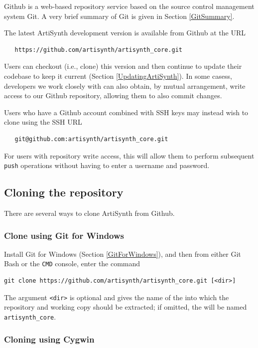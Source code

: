 Github is a web-based repository service based on the source control
management system Git. A very brief summary of Git is given in
Section \ref{GitSummary}.

The latest ArtiSynth development version is available from Github at the URL
\begin{verbatim}
   https://github.com/artisynth/artisynth_core.git
\end{verbatim}
Users can checkout (i.e., clone) this version and then continue to
update their codebase to keep it current
(Section \ref{UpdatingArtiSynth}). 
In some casess, developers we work closely with can also obtain, by
mutual arrangement, write access to our Github repository, allowing
them to also commit changes.

\begin{sideblock}
Users who have a Github account combined with SSH keys may instead
wish to clone using the SSH URL
\begin{verbatim}
   git@github.com:artisynth/artisynth_core.git
\end{verbatim}
For users with repository write access, this will allow them to
perform subsequent {\tt push} operations without having to
enter a username and password.
\end{sideblock}

\subsection{Cloning the repository}

There are several ways to clone ArtiSynth from Github.

\ifWindows

\subsubsection{Clone using Git for Windows}
\label{CloningUsingGitForWindows}

Install Git for Windows (Section \ref{GitForWindows}), and then from
either Git Bash or the {\tt CMD} console, enter the command
%
\begin{lstlisting}[]
  git clone https://github.com/artisynth/artisynth_core.git [<dir>]
\end{lstlisting}
%
The argument {\tt <dir>} is optional and gives the name of the
\directory{} into which the repository and working copy should be
extracted; if omitted, the \directory{} will be named {\tt
artisynth\_core}.

\subsubsection{Cloning using Cygwin}

